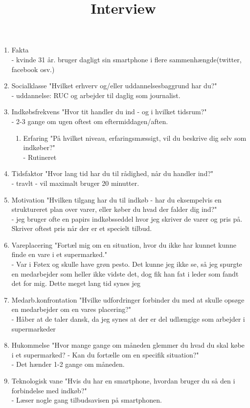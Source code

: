 \title{Interview}



\maketitle
 
\begin{enumerate}
\item Fakta\\
  - kvinde 31 år. bruger dagligt sin smartphone i flere sammenhængde(twitter, facebook osv.)
\item Socialklasse "Hvilket erhverv og/eller uddannelsesbaggrund har du?"\\
  - uddannelse: RUC og arbejder til daglig som journalist.
\item Indkøbsfrekvens "Hvor tit handler du ind - og i hvilket tidsrum?"\\
  - 2-3 gange om ugen oftest om eftermiddagen/aften. 
\begin{enumerate}
\item Erfaring	"På hvilket niveau, erfaringsmæssigt, vil du beskrive dig selv som indkøber?"\\
  - Rutineret
\end{enumerate}

\item Tidsfaktor "Hvor lang tid har du til rådighed, når du handler ind?"\\
  - travlt - vil maximalt bruger 20 minutter.
\item Motivation "Hvilken tilgang har du til indkøb - har du eksempelvis en struktureret plan over varer, eller køber du hvad der falder dig ind?"\\
  - jeg bruger ofte en papirs indkøbsseddel hvor jeg skriver de varer og pris på. Skriver oftest pris når der er et specielt tilbud.
\item  Vareplacering "Fortæl mig om en situation, hvor du ikke har kunnet kunne finde en vare i et supermarked."\\
  - Var i Føtex og skulle have grøn pesto. Det kunne jeg ikke se, så jeg spurgte en medarbejder som heller ikke vidste det, 
    dog fik han fat i leder som fandt det for mig. Dette meget lang tid synes jeg
\item Medarb.konfrontation "Hvilke udfordringer forbinder du med at skulle opsøge en medarbejder om en vares placering?"\\
  - Håber at de taler dansk, da jeg synes at der er del udlængige som arbejder i supermarkeder
\item Hukommelse "Hvor mange gange om måneden glemmer du hvad du skal købe i et supermarked? - Kan du fortælle om en specifik situation?"\\
  - Det hænder 1-2 gange om måneden.
\item Teknologisk vane "Hvis du har en smartphone, hvordan bruger du så den i forbindelse med indkøb?"\\
  - Læser nogle gang tilbudsavisen på smartphonen.


\end{enumerate}
